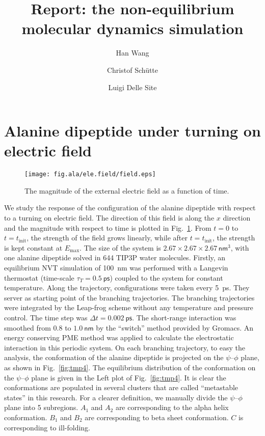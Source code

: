 \documentclass[a4paper,preprint,onecolumn]{revtex4-1}
\begin{document}
\title{Report: the non-equilibrium molecular dynamics simulation}
\author{Han Wang}
\author{Christof Sch\"utte}
\author{Luigi Delle Site}

\begin{abstract}
\end{abstract}

\maketitle

\newpage


\section{Alanine dipeptide
  under turning on electric field}
\begin{figure}
  \centering
  \texttt{[image: fig.ala/ele.field/field.eps]}
  \caption{The magnitude of the external electric field as
    a function of time.}
  \label{fig:tmp3}
\end{figure}

We study the response of the configuration of the alanine dipeptide
with respect to a turning on electric field. The direction of this
field is along the $x$ direction and the magnitude with respect to time
is plotted in Fig.~\ref{fig:tmp3}. From $t=0$ to
$t=t_{\textrm{init}}$, the strength of the field grows linearly, while
after $t=t_{\textrm{init}}$, the strength is kept constant at
$E_{\textrm{max}}$.  The size of the system is $2.67\times 2.67\times
2.67\, \textsf{nm}^3$, with one alanine dipeptide solved in 644 TIP3P
water molecules. Firstly, an equilibrium NVT simulation of
100~\textsf{nm} was performed with a Langevin thermostat (time-scale
$\tau_T = 0.5~\textsf{ps}$) coupled to the system for constant
temperature.  Along the trajectory, configurations were taken every
5~\textsf{ps}.  They server as starting point of the branching
trajectories. The branching trajectories were integrated by the
Leap-frog scheme without any temperature and pressure control.  The
time step was $\Delta t = 0.002~\textsf{ps}$. The short-range
interaction was smoothed from $0.8$ to $1.0~\textsf{nm}$ by the
``switch'' method provided by Gromacs.  An energy conserving PME
method was applied to calculate the electrostatic interaction in this
periodic system.  On each branching trajectory, to easy the analysis,
the conformation of the alanine dipeptide is projected on the
$\psi$--$\phi$ plane, as shown in Fig.~\ref{fig:tmp4}. The equilibrium
distribution of the conformation on the $\psi$--$\phi$ plane is given
in the Left plot of Fig.~\ref{fig:tmp4}.  It is clear the
conformations are populated in several clusters that are called
``metastable states'' in this research. For a clearer definition, we
manually divide the $\psi$--$\phi$ plane into 5 subregions. $A_1$ and
$A_2$ are corresponding to the alpha helix conformation. $B_1$ and
$B_2$ are corresponding
to beta sheet conformation. $C$ is corresponding to ill-folding.\\
\end{document}
